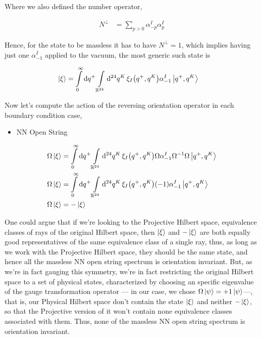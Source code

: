 Where we also defined the number operator,

\begin{align*}
    N^\perp&=\sum\limits_{p> 0}\alpha^I_{-p}\alpha^I_{p}
\end{align*}

Hence, for the state to be massless it has to have $N^\perp=1$, which implies having just one $\alpha_{-1}^I$ applied to the vacuum, 
the most generic such state is

\begin{align*}
    \ket{\xi}&=\int\limits_0^\infty\dd{q^+}\int\limits_{\mathbb R^{24}}\dd[24]{q^K}\xi_{I}\qty(q^+,q^K)\alpha^I_{-1}\ket{q^+,q^K}
\end{align*}

Now let's compute the action of the reversing orientation operator in each boundary condition case,

\begin{itemize}
    \item NN Open String
\end{itemize}
\begin{align*}
    \Omega\ket{\xi}&=\int\limits_0^\infty\dd{q^+}\int\limits_{\mathbb R^{24}}\dd[24]{q^K}\xi_{I}\qty(q^+,q^K)\Omega\alpha^I_{-1}\Omega^{-1}\Omega\ket{q^+,q^K}\\
    \Omega\ket{\xi}&=\int\limits_0^\infty\dd{q^+}\int\limits_{\mathbb R^{24}}\dd[24]{q^K}\xi_{I}\qty(q^+,q^K)\qty(-1)\alpha^I_{-1}\ket{q^+,q^K}\\
    \Omega\ket{\xi}&=-\ket\xi
\end{align*}

One could argue that if we're looking to the Projective Hilbert space, equivalence classes of rays of the original Hilbert space, then $\ket \xi$ and $-\ket \xi$ 
are both equally good representatives of the same equivalence class of a single ray, thus, as long as we work with the Projective Hilbert space, 
they should be the same state, and hence all the massless NN open string spectrum is orientation invariant. But, as we're in fact gauging this symmetry, 
we're in fact restricting the original Hilbert space to a set of physical states, characterized by choosing an specific eigenvalue of the 
gauge transformation operator --- in our case, we chose $\Omega\ket{\psi}=+1\ket\psi$---, that is, our Physical Hilbert space don't contain the state $\ket\xi$ and neither $-\ket\xi$, so that the Projective version 
of it won't contain none equivalence classes associated with them. Thus, none of the massless NN open string spectrum is orientation invariant.

